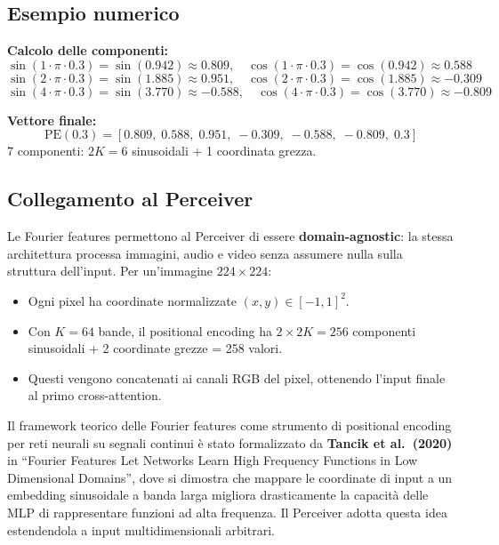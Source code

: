 \documentclass[
  11pt,
]{article}
\begin{document}
\subsection{Esempio numerico}

\begin{notabox}[title={\textbf{Esempio: $x = 0.3$, $K = 3$ bande, frequenze $f_1=1, f_2=2, f_3=4$}}]
\textbf{Calcolo delle componenti:}
\[
\sin(1 \cdot \pi \cdot 0.3) = \sin(0.942) \approx 0.809, \quad \cos(1 \cdot \pi \cdot 0.3) = \cos(0.942) \approx 0.588
\]
\[
\sin(2 \cdot \pi \cdot 0.3) = \sin(1.885) \approx 0.951, \quad \cos(2 \cdot \pi \cdot 0.3) = \cos(1.885) \approx -0.309
\]
\[
\sin(4 \cdot \pi \cdot 0.3) = \sin(3.770) \approx -0.588, \quad \cos(4 \cdot \pi \cdot 0.3) = \cos(3.770) \approx -0.809
\]

\textbf{Vettore finale:}
\[
\text{PE}(0.3) = [0.809,\;0.588,\;0.951,\;-0.309,\;-0.588,\;-0.809,\;0.3]
\]
7 componenti: $2K = 6$ sinusoidali + 1 coordinata grezza.
\end{notabox}

\subsection{Collegamento al Perceiver}

\begin{notabox}[title={\textbf{Fourier features nel Perceiver IO}}]
Le Fourier features permettono al Perceiver di essere \textbf{domain-agnostic}: la stessa architettura processa immagini, audio e video senza assumere nulla sulla struttura dell'input. Per un'immagine $224 \times 224$:
\begin{itemize}
  \item Ogni pixel ha coordinate normalizzate $(x, y) \in [-1,1]^2$.
  \item Con $K=64$ bande, il positional encoding ha $2 \times 2K = 256$ componenti sinusoidali + 2 coordinate grezze = 258 valori.
  \item Questi vengono concatenati ai canali RGB del pixel, ottenendo l'input finale al primo cross-attention.
\end{itemize}
Il framework teorico delle Fourier features come strumento di positional encoding per reti neurali su segnali continui è stato formalizzato da \textbf{Tancik et al.\ (2020)} in ``Fourier Features Let Networks Learn High Frequency Functions in Low Dimensional Domains'', dove si dimostra che mappare le coordinate di input a un embedding sinusoidale a banda larga migliora drasticamente la capacità delle MLP di rappresentare funzioni ad alta frequenza. Il Perceiver adotta questa idea estendendola a input multidimensionali arbitrari.
\end{notabox}
\end{document}
